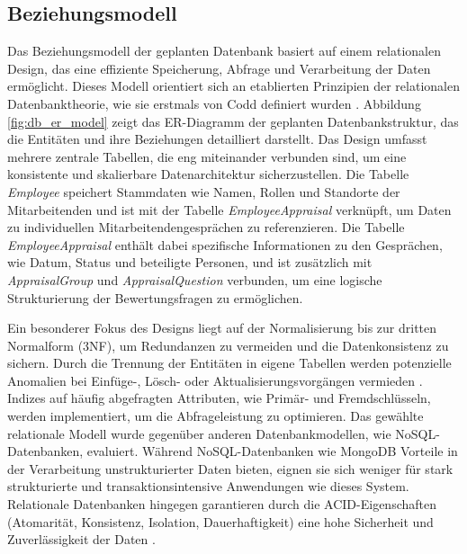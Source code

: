 \subsection{Beziehungsmodell} Das Beziehungsmodell der geplanten Datenbank basiert auf einem relationalen Design, das eine effiziente Speicherung, Abfrage und Verarbeitung der Daten ermöglicht. Dieses Modell orientiert sich an etablierten Prinzipien der relationalen Datenbanktheorie, wie sie erstmals von Codd definiert wurden \cite{codd1970relational}. Abbildung \ref{fig:db_er_model} zeigt das ER-Diagramm der geplanten Datenbankstruktur, das die Entitäten und ihre Beziehungen detailliert darstellt. Das Design umfasst mehrere zentrale Tabellen, die eng miteinander verbunden sind, um eine konsistente und skalierbare Datenarchitektur sicherzustellen. Die Tabelle \textit{Employee} speichert Stammdaten wie Namen, Rollen und Standorte der Mitarbeitenden und ist mit der Tabelle \textit{EmployeeAppraisal} verknüpft, um Daten zu individuellen Mitarbeitendengesprächen zu referenzieren. Die Tabelle \textit{EmployeeAppraisal} enthält dabei spezifische Informationen zu den Gesprächen, wie Datum, Status und beteiligte Personen, und ist zusätzlich mit \textit{AppraisalGroup} und \textit{AppraisalQuestion} verbunden, um eine logische Strukturierung der Bewertungsfragen zu ermöglichen.

Ein besonderer Fokus des Designs liegt auf der Normalisierung bis zur dritten Normalform (3NF), um Redundanzen zu vermeiden und die Datenkonsistenz zu sichern. Durch die Trennung der Entitäten in eigene Tabellen werden potenzielle Anomalien bei Einfüge-, Lösch- oder Aktualisierungsvorgängen vermieden \cite{elmasri2020fundamentals}. Indizes auf häufig abgefragten Attributen, wie Primär- und Fremdschlüsseln, werden implementiert, um die Abfrageleistung zu optimieren. Das gewählte relationale Modell wurde gegenüber anderen Datenbankmodellen, wie NoSQL-Datenbanken, evaluiert. Während NoSQL-Datenbanken wie MongoDB Vorteile in der Verarbeitung unstrukturierter Daten bieten, eignen sie sich weniger für stark strukturierte und transaktionsintensive Anwendungen wie dieses System. Relationale Datenbanken hingegen garantieren durch die ACID-Eigenschaften (Atomarität, Konsistenz, Isolation, Dauerhaftigkeit) eine hohe Sicherheit und Zuverlässigkeit der Daten \cite{stonebraker2010nosql}.

